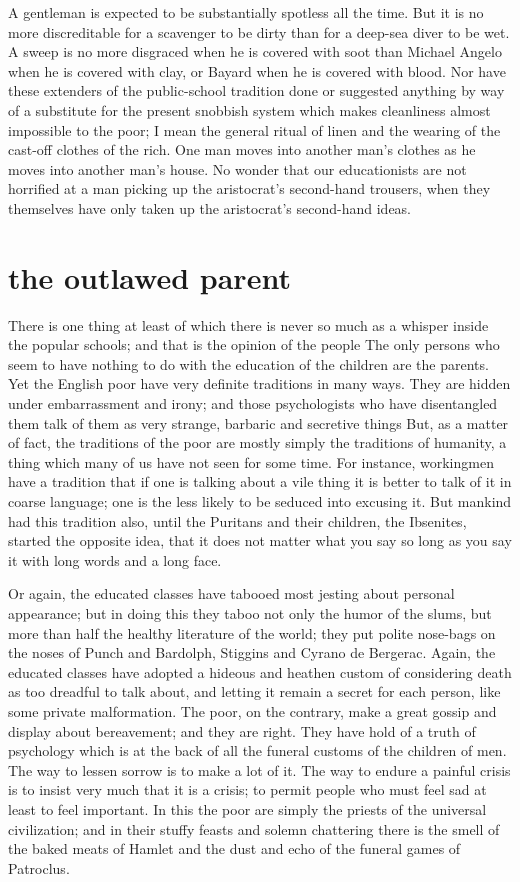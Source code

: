 \documentclass[final,10pt,letterpaper,twocolumn,openany]{book}
\begin{document}
A gentleman is expected to be
substantially spotless all the time. But it is no more discreditable for a
scavenger to be dirty than for a deep-sea diver to be wet. A sweep is no
more disgraced when he is covered with soot than Michael Angelo when
he is covered with clay, or Bayard when he is covered with blood. Nor
have these extenders of the public-school tradition done or suggested
anything by way of a substitute for the present snobbish system which
makes cleanliness almost impossible to the poor; I mean the general ritual
of linen and the wearing of the cast-off clothes of the rich. One man
moves into another man's clothes as he moves into another man's house.
No wonder that our educationists are not horrified at a man picking up the
aristocrat's second-hand trousers, when they themselves have only taken
up the aristocrat's second-hand ideas.

\section{the outlawed parent}

    There is one thing at least of which there is never so much as a
whisper inside the popular schools; and that is the opinion of the people
The only persons who seem to have nothing to do with the education of
the children are the parents. Yet the English poor have very definite
traditions in many ways. They are hidden under embarrassment and irony;
and those psychologists who have disentangled them talk of them as very
strange, barbaric and secretive things But, as a matter of fact, the traditions
of the poor are mostly simply the traditions of humanity, a thing which
many of us have not seen for some time. For instance, workingmen have a
tradition that if one is talking about a vile thing it is better to talk of it in
coarse language; one is the less likely to be seduced into excusing it. But
mankind had this tradition also, until the Puritans and their children, the
Ibsenites, started the opposite idea, that it does not matter what you say so
long as you say it with long words and a long face. 

Or again, the educated
classes have tabooed most jesting about personal appearance; but in doing
this they taboo not only the humor of the slums, but more than half the
healthy literature of the world; they put polite nose-bags on the noses of
Punch and Bardolph, Stiggins and Cyrano de Bergerac. Again, the
educated classes have adopted a hideous and heathen custom of
considering death as too dreadful to talk about, and letting it remain a
secret for each person, like some private malformation. The poor, on the
contrary, make a great gossip and display about bereavement; and they are
right. They have hold of a truth of psychology which is at the back of all
the funeral customs of the children of men. The way to lessen sorrow is to
make a lot of it. The way to endure a painful crisis is to insist very much
that it is a crisis; to permit people who must feel sad at least to feel
important. In this the poor are simply the priests of the universal
civilization; and in their stuffy feasts and solemn chattering there is the
smell of the baked meats of Hamlet and the dust and echo of the funeral
games of Patroclus.
\end{document}
